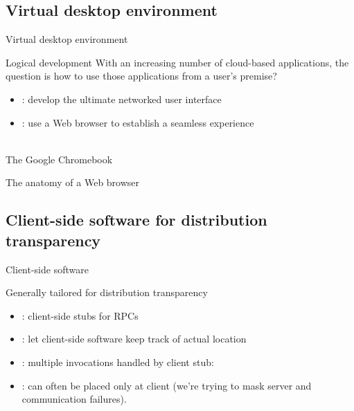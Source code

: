 \subsection{Virtual desktop environment}
\begin{slide}{Virtual desktop environment}
  \begin{block}{Logical development}
    With an increasing number of cloud-based applications, the question is how to use those applications from
    a user's premise?
    \begin{itemize}\firmlist
    \item {}: develop the ultimate networked user interface
    \item {}: use a Web browser to establish a seamless experience
    \end{itemize}
  \end{block}
  \begin{centerfig}
     \\
    The Google Chromebook
  \end{centerfig}
\end{slide}
\begin{slide}{The anatomy of a Web browser}
  \begin{centerfig}
  \end{centerfig}
\end{slide}
\subsection{Client-side software for distribution transparency}
\begin{slide}{Client-side software}
  \begin{block}{Generally tailored for distribution transparency}
    \begin{itemize}\tightlist
    \item {}: client-side stubs for RPCs
    \item {}: let client-side software keep track of actual location
    \item {}: multiple invocations handled by client stub:
      \begin{center}
      \end{center}
    \item {}: can often be placed only at client (we're trying to mask server and
      communication failures).
    \end{itemize}
  \end{block}
\end{slide}
